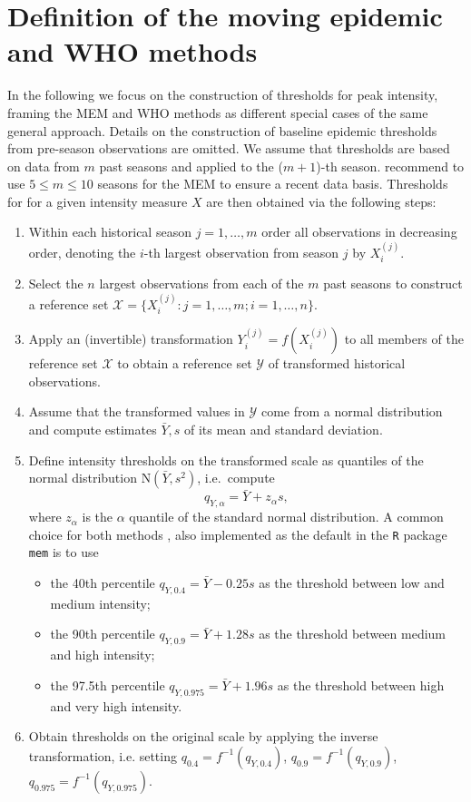 \documentclass{article}
\newcommand{\sd}{s}
\newcommand{\mean}{\bar{Y}}
\begin{document}
\section{Definition of the moving epidemic and WHO methods}
\label{sec:definitions}

In the following we focus on the construction of thresholds  for peak intensity, framing the MEM and WHO methods as different special cases of the same general approach. Details on the construction of baseline epidemic thresholds from pre-season observations are omitted. We assume that thresholds are based on data from $m$ past seasons and applied to the ($m + 1$)-th season. \cite{Vega2015} recommend to use $5 \leq m \leq 10$ seasons for the MEM to ensure a recent data basis. Thresholds for for a given intensity measure $X$ are then obtained via the following steps:

\begin{enumerate}
\item Within each historical season $j = 1, \dots, m$ order all observations in decreasing order, denoting the $i$-th largest observation from season $j$ by $X^{(j)}_i$.
\item Select the $n$ largest observations from each of the $m$ past seasons to construct a reference set $\mathcal{X} = \{X_i^{(j)}: j = 1, \dots, m; i = 1, \dots, n\}$.
\item Apply an (invertible) transformation $Y_i^{(j)} = f(X_i^{(j)})$ to all members of the reference set $\mathcal{X}$ to obtain a reference set $\mathcal{Y}$ of transformed historical observations.
\item Assume that the transformed values in $\mathcal{Y}$ come from a normal distribution and compute estimates $\mean, \sd$ of its mean and standard deviation.
\item Define intensity thresholds on the transformed scale as quantiles of the normal distribution N$(\mean, \sd^2)$, i.e.\ compute
\begin{equation}
q_{Y, \alpha} = \mean + z_\alpha \sd, \label{eq:def_q}
\end{equation}
where $z_\alpha$ is the $\alpha$ quantile of the standard normal distribution. A common choice for both methods \citep{WHO2017}, also implemented as the default in the \texttt{R} package \texttt{mem} \citep{Lozano2020} is to use
\begin{itemize}
\item the 40th percentile $q_{Y, 0.4} = \mean - 0.25 \sd$ as the threshold between low and medium intensity;
\item the 90th percentile $q_{Y, 0.9} = \mean + 1.28 \sd$ as the threshold between medium and high intensity;
\item the 97.5th percentile $q_{Y, 0.975} = \mean + 1.96\sd$ as the threshold between high and very high intensity.
\end{itemize}
\item Obtain thresholds on the original scale by applying the inverse transformation, i.e. setting $q_{0.4} = f^{-1}(q_{Y, 0.4})$, $q_{0.9} = f^{-1}(q_{Y, 0.9})$, $q_{0.975} = f^{-1}(q_{Y, 0.975})$.
\end{enumerate}
\end{document}
